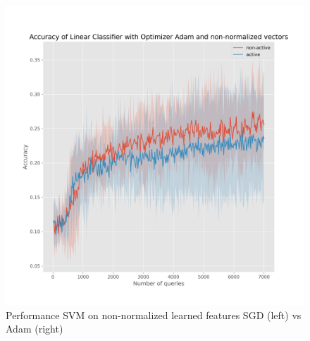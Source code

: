 \documentclass{article}
\begin{document}
\begin{figure}[h]
\begin{minipage}{.45\textwidth}
    \includegraphics[width=\linewidth]{active-vs-base-mnist-linear-loss-Adam-non-normalized-ci}
  \end{minipage}
  \caption{Performance SVM on non-normalized learned features SGD (left) vs Adam (right)}\label{fig:svm-non-normalized-ci-mnist}
\end{figure}
\end{document}

